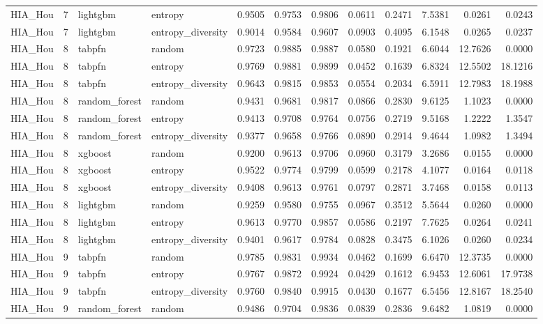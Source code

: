 \begin{tabular}{lrllrrrrrrrr}
HIA_Hou & 7 & lightgbm & entropy & 0.9505 & 0.9753 & 0.9806 & 0.0611 & 0.2471 & 7.5381 & 0.0261 & 0.0243 \\
HIA_Hou & 7 & lightgbm & entropy_diversity & 0.9014 & 0.9584 & 0.9607 & 0.0903 & 0.4095 & 6.1548 & 0.0265 & 0.0237 \\
HIA_Hou & 8 & tabpfn & random & 0.9723 & 0.9885 & 0.9887 & 0.0580 & 0.1921 & 6.6044 & 12.7626 & 0.0000 \\
HIA_Hou & 8 & tabpfn & entropy & 0.9769 & 0.9881 & 0.9899 & 0.0452 & 0.1639 & 6.8324 & 12.5502 & 18.1216 \\
HIA_Hou & 8 & tabpfn & entropy_diversity & 0.9643 & 0.9815 & 0.9853 & 0.0554 & 0.2034 & 6.5911 & 12.7983 & 18.1988 \\
HIA_Hou & 8 & random_forest & random & 0.9431 & 0.9681 & 0.9817 & 0.0866 & 0.2830 & 9.6125 & 1.1023 & 0.0000 \\
HIA_Hou & 8 & random_forest & entropy & 0.9413 & 0.9708 & 0.9764 & 0.0756 & 0.2719 & 9.5168 & 1.2222 & 1.3547 \\
HIA_Hou & 8 & random_forest & entropy_diversity & 0.9377 & 0.9658 & 0.9766 & 0.0890 & 0.2914 & 9.4644 & 1.0982 & 1.3494 \\
HIA_Hou & 8 & xgboost & random & 0.9200 & 0.9613 & 0.9706 & 0.0960 & 0.3179 & 3.2686 & 0.0155 & 0.0000 \\
HIA_Hou & 8 & xgboost & entropy & 0.9522 & 0.9774 & 0.9799 & 0.0599 & 0.2178 & 4.1077 & 0.0164 & 0.0118 \\
HIA_Hou & 8 & xgboost & entropy_diversity & 0.9408 & 0.9613 & 0.9761 & 0.0797 & 0.2871 & 3.7468 & 0.0158 & 0.0113 \\
HIA_Hou & 8 & lightgbm & random & 0.9259 & 0.9580 & 0.9755 & 0.0967 & 0.3512 & 5.5644 & 0.0260 & 0.0000 \\
HIA_Hou & 8 & lightgbm & entropy & 0.9613 & 0.9770 & 0.9857 & 0.0586 & 0.2197 & 7.7625 & 0.0264 & 0.0241 \\
HIA_Hou & 8 & lightgbm & entropy_diversity & 0.9401 & 0.9617 & 0.9784 & 0.0828 & 0.3475 & 6.1026 & 0.0260 & 0.0234 \\
HIA_Hou & 9 & tabpfn & random & 0.9785 & 0.9831 & 0.9934 & 0.0462 & 0.1699 & 6.6470 & 12.3735 & 0.0000 \\
HIA_Hou & 9 & tabpfn & entropy & 0.9767 & 0.9872 & 0.9924 & 0.0429 & 0.1612 & 6.9453 & 12.6061 & 17.9738 \\
HIA_Hou & 9 & tabpfn & entropy_diversity & 0.9760 & 0.9840 & 0.9915 & 0.0430 & 0.1677 & 6.5456 & 12.8167 & 18.2540 \\
HIA_Hou & 9 & random_forest & random & 0.9486 & 0.9704 & 0.9836 & 0.0839 & 0.2836 & 9.6482 & 1.0819 & 0.0000 \\

\end{tabular}

